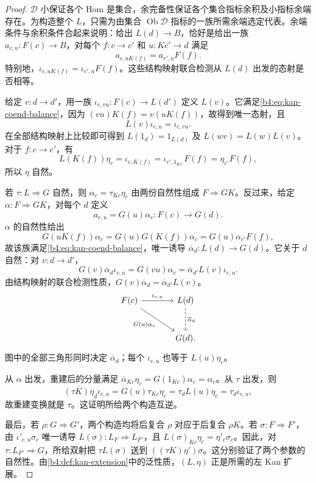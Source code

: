 \begin{proof}
	\(\mathcal D\) 小保证各个 Hom 是集合，余完备性保证各个集合指标余积及小指标余端存在。为构造整个 \(L\)，只需为由集合 \(\operatorname{Ob}\mathcal D\) 指标的一族所需余端选定代表。余端条件与余积条件合起来说明：给出 \(L(d)\rightarrow B\)，恰好是给出一族 \(a_{c,u}:F(c)\rightarrow B\)，对每个 \(f:c\rightarrow c'\) 和 \(u:Kc'\rightarrow d\) 满足
	\begin{equation}\label{b4:eq:kan-coend-balance}
		a_{c,uK(f)}=a_{c',u}F(f).
	\end{equation}
	特别地，\(\iota_{c,uK(f)}=\iota_{c',u}F(f)\)。这些结构映射联合检测从 \(L(d)\) 出发的态射是否相等。

	给定 \(v:d\rightarrow d'\)，用一族 \(\iota_{c,vu}:F(c)\rightarrow L(d')\) 定义 \(L(v)\)。它满足\eqref{b4:eq:kan-coend-balance}，因为 \((vu)K(f)=v(uK(f))\)，故得到唯一态射，且
	\[
		L(v)\iota_{c,u}=\iota_{c,vu}.
	\]
	在全部结构映射上比较即可得到 \(L(1_d)=1_{L(d)}\) 及 \(L(wv)=L(w)L(v)\)。对于 \(f:c\rightarrow c'\)，有
	\[
		L(K(f))\eta_c
		=\iota_{c,K(f)}
		=\iota_{c',1_{Kc'}}F(f)
		=\eta_{c'}F(f),
	\]
	所以 \(\eta\) 自然。

	若 \(\tau:L\Rightarrow G\) 自然，则 \(\alpha_c=\tau_{Kc}\eta_c\) 由两份自然性组成 \(F\Rightarrow GK\)。反过来，给定 \(\alpha:F\Rightarrow GK\)，对每个 \(d\) 定义
	\[
		a_{c,u}=G(u)\alpha_c:F(c)\longrightarrow G(d).
	\]
	\(\alpha\) 的自然性给出
	\[
		G(uK(f))\alpha_c
		=G(u)G(K(f))\alpha_c
		=G(u)\alpha_{c'}F(f),
	\]
	故该族满足\eqref{b4:eq:kan-coend-balance}，唯一诱导 \(\overline\alpha_d:L(d)\rightarrow G(d)\)。它关于 \(d\) 自然：对 \(v:d\rightarrow d'\)，
	\[
		G(v)\overline\alpha_d\iota_{c,u}
		=G(vu)\alpha_c
		=\overline\alpha_{d'}L(v)\iota_{c,u}.
	\]
	由结构映射的联合检测性质，\(G(v)\overline\alpha_d=\overline\alpha_{d'}L(v)\)。
	\[
		\begin{tikzcd}[column sep=large,row sep=large]
			F(c)\arrow[r,"\iota_{c,u}"]\arrow[dr,"G(u)\alpha_c"']&L(d)\arrow[d,dashed,"\overline\alpha_d"]\\
			&G(d).
		\end{tikzcd}
	\]
	图中的全部三角形同时决定 \(\overline\alpha_d\)；每个 \(\iota_{c,u}\) 也等于 \(L(u)\eta_c\)。

	从 \(\alpha\) 出发，重建后的分量满足 \(\overline\alpha_{Kc}\eta_c=G(1_{Kc})\alpha_c=\alpha_c\)。从 \(\tau\) 出发，则
	\[
		\overline{(\tau K)\eta}_d\iota_{c,u}
		=G(u)\tau_{Kc}\eta_c
		=\tau_dL(u)\eta_c
		=\tau_d\iota_{c,u},
	\]
	故重建变换就是 \(\tau\)。这证明所给两个构造互逆。

	最后，若 \(\rho:G\Rightarrow G'\)，两个构造均将后复合 \(\rho\) 对应于后复合 \(\rho K\)。若 \(\sigma:F\Rightarrow F'\)，由 \(\iota'_{c,u}\sigma_c\) 唯一诱导 \(L(\sigma):L_F\Rightarrow L_{F'}\)，且 \(L(\sigma)_{Kc}\eta_c=\eta'_c\sigma_c\)。因此，对 \(\tau:L_{F'}\Rightarrow G\)，所给双射把 \(\tau L(\sigma)\) 送到 \(((\tau K)\eta')\sigma\)。这分别验证了两个参数的自然性。由\cref{b4:def:kan-extension}中的泛性质，\((L,\eta)\) 正是所需的左 Kan 扩展。
\end{proof}

